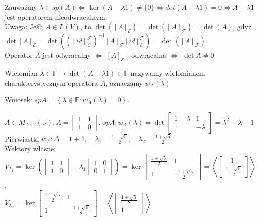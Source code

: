 \documentclass[../main.tex]{subfiles}
\begin{document}
Zauważmy $\lambda \in sp(A) \iff \ker(A - \lambda 1) \neq \{0\} \iff det(A-\lambda 1) = 0 \iff A - \lambda 1$ jest operatorem nieodwracalnym.\\
Uwaga: Jeśli $A\in L(V)$, to $\det\left( [A]_\mathcal{E} \right)  = \det \left( [A]_\mathcal{F} \right)  = \det(A)$, gdyż $\det[A]_{\mathcal{E}} = \det\left( \left( [id]_\mathcal{E}^\mathcal{F} \right) ^{-1} [A]_\mathcal{F}[id]_\mathcal{E}^\mathcal{F} \right) = \det\left( [A]_\mathcal{F} \right) $.\\
Operator $A$ jest odwracalny $\iff$ $[A]_\mathcal{E}$ - odwracalna $\iff$ $\det A \neq 0$
\begin{definicja}
    Wielomian $\lambda\in\mathbb{F}\to \det(A-\lambda 1) \in \mathbb{F}$ nazywamy wielomianem charakterystycznym operatora $A$, oznaczamy $w_A(\lambda)$
\end{definicja}
Wniosek: $sp A = \left\{ \lambda\in\mathbb{F}: w_A(\lambda) = 0 \right\} $.\\
\begin{przyklad}
    $A\in M_{2\times 2}(\mathbb{R}), A = \begin{bmatrix} 1&1\\1&0 \end{bmatrix} $. $sp A: w_A(\lambda) = \det \begin{bmatrix} 1-\lambda&1\\1&-\lambda \end{bmatrix} = \lambda^2 - \lambda - 1$\\
    Pierwiastki $w_A: \Delta = 1+4,\quad \lambda_1 = \frac{1-\sqrt{5} }{2}, \quad \lambda_2 = \frac{1+\sqrt{5} }{2}$\\
    Wektory własne: $V_{\lambda_1} = \ker\left(\begin{bmatrix} 1&1\\1&0 \end{bmatrix} - \lambda_1 \begin{bmatrix} 1&0\\0&1 \end{bmatrix}\right) = \ker \begin{bmatrix} \frac{1+\sqrt{5} }{2} & 1 \\ 1 & \frac{-1+\sqrt{5} }{2} \end{bmatrix} = \left<\begin{bmatrix} -1\\ \frac{1+\sqrt{5} }{2} \end{bmatrix}  \right> $.\\
    $V_{\lambda_2} = \ker \begin{bmatrix} \frac{1-\sqrt{5} }{2} & 1 \\ 1 & - \frac{1+\sqrt{5} }{2} \end{bmatrix} = \left<\begin{bmatrix} \frac{1+\sqrt{5} }{2}\\1 \end{bmatrix}  \right>$
\end{przyklad}
\end{document}
